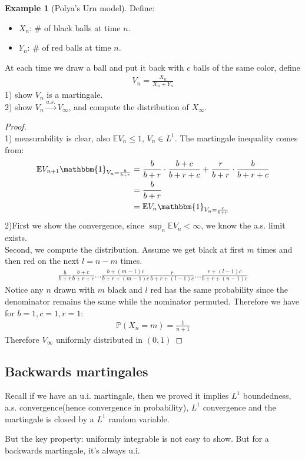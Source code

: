 \documentclass[a4paper,11pt]{book}
\theoremstyle{definition}
\newtheorem*{example}{Example}
\theoremstyle{remark}
\begin{document}
\begin{example}[Polya's Urn model]
Define:
\begin{itemize}
	\item $X_n$: \# of black balls at time $n$.
	\item $Y_n$: \# of red balls at time $n$.
\end{itemize}
At each time we draw a ball and put it back with $c$ balls of the same color, define
\begin{align*}
	V_n = \frac{X_n}{X_n + Y_n}
\end{align*}
1) show $V_n$ is a martingale.\\
2) show $V_n \overset{a.s.}{\rightarrow} V_\infty$, and compute the distribution of $X_\infty$.
\begin{proof}
	\quad\\
	1) measurability is clear, also $\mathbb{E}V_n \le 1$, $V_n \in L^1$. The martingale inequality comes from:
	\begin{align*}
		\mathbb{E} V_{n+1} \mathbbm{1}_{V_n = \frac{b}{b+r}} &= \frac{b}{b+r}  \cdot \frac{b+c}{b+r+c} + \frac{r}{b + r} \cdot \frac{b}{b + r + c}\\
		&= \frac{b}{b+r}\\
		&= \mathbb{E} V_n \mathbbm{1}_{V_n = \frac{r}{b+r}}
	\end{align*}
	2)First we show the convergence, since $\sup_n \mathbb{E} V_n < \infty$, we know the a.s. limit exists. \\
	Second, we compute the distribution. Assume we get black at first $m$ times and then red on the next $l = n-m$ times.
	\begin{align*}
		 \frac{b}{b+r} \frac{b+c}{b+r+c} \dots \frac{b+(m-1)c}{b+r + (m-1)c} \frac{r}{b+r +(l-1)c} \dots \frac{r + (l-1)c}{b+r+(n-1)c}
	\end{align*}
	Notice any $n$ drawn with $m$ black and $l$ red has the same probability since the denominator remains the same while the nominator permuted. Therefore we have for $b = 1, c= 1, r = 1$:
	\begin{align*}
		\mathbb{P}(X_n = m) = \frac{1}{n+1}
	\end{align*}
	Therefore $V_\infty$ uniformly distributed in $(0, 1)$
\end{proof} 	
\end{example}





\subsection{Backwards martingales}
Recall if we have an u.i. martingale, then we proved it implies $L^1$ boundedness, a.s. convergence(hence convergence in probability), $L^1$ convergence and the martingale is closed by a $L^1$ random variable.\par
But the key property: uniformly integrable is not easy to show. But for a backwards martingale, it's always u.i.
\end{document}

